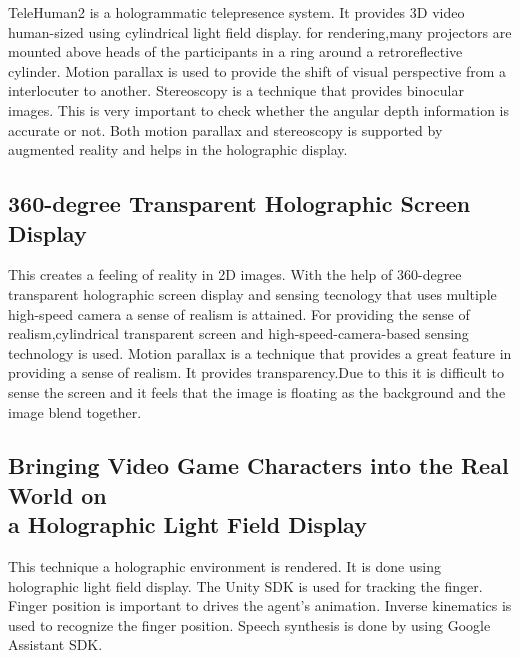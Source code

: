 \documentclass{fisatproject}
\begin{document}
TeleHuman2 is a hologrammatic telepresence system.
It provides 3D video human-sized using cylindrical light field display.
for rendering,many projectors are mounted above heads of the participants in a ring around a retroreflective cylinder.
Motion parallax is used to provide the shift of visual perspective from a interlocuter to another.
Stereoscopy is a technique that provides binocular images.
This is very important to check whether the angular depth information is accurate or not.
Both motion parallax and stereoscopy is supported by augmented reality and helps in the holographic display.

\subsection{ 
  \normalsize 360-degree Transparent Holographic Screen Display
}


This creates a feeling of reality in 2D images.
With the help of 360-degree transparent holographic screen display and sensing tecnology that uses multiple high-speed camera a sense of realism is attained.
For providing the sense of realism,cylindrical transparent screen and high-speed-camera-based sensing technology is used.
Motion parallax is a technique that provides a great feature in providing a sense of realism.
It provides transparency.Due to this it is difficult to sense the screen and it feels that the image is floating as the background and the image blend together.


\subsection{ 
  \normalsize  Bringing Video Game Characters into the Real World on \\a Holographic Light Field Display
}

This technique a holographic environment is rendered.
It is done using holographic light field display.
The Unity SDK is used for tracking the finger.
Finger position is important to drives the  agent's animation.
Inverse kinematics is used to recognize the finger position.
Speech synthesis is done by using Google Assistant SDK.
\end{document}
